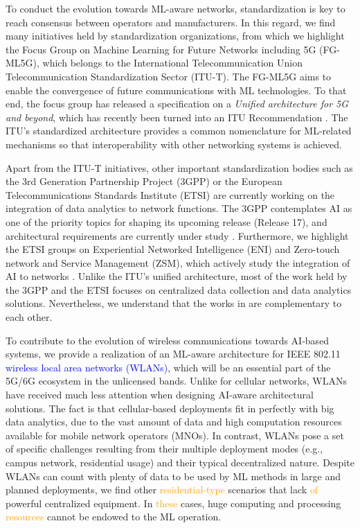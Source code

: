 \documentclass[journal]{IEEEtran}
\begin{document}
To conduct the evolution towards ML-aware networks, standardization is key to reach consensus between operators and manufacturers. In this regard, we find many initiatives held by standardization organizations, from which we highlight the Focus Group on Machine Learning for Future Networks including 5G (FG-ML5G), which belongs to the International Telecommunication Union Telecommunication Standardization Sector (ITU-T). The FG-ML5G aims to enable the convergence of future communications with ML technologies. To that end, the focus group has released a specification on a \emph{Unified architecture for 5G and beyond}, which has recently been turned into an ITU Recommendation \cite{itu2019architecture}. The ITU's standardized architecture provides a common nomenclature for ML-related mechanisms so that interoperability with other networking systems is achieved. 

Apart from the ITU-T initiatives, other important standardization bodies such as the 3rd Generation Partnership Project (3GPP) or the European Telecommunications Standards Institute (ETSI) are currently working on the integration of data analytics to network functions. The 3GPP contemplates AI as one of the priority topics for shaping its upcoming release (Release 17), and architectural requirements are currently under study \cite{3gpp2019study}. Furthermore, we highlight the ETSI groups on Experiential Networked Intelligence (ENI) and Zero-touch network and Service Management (ZSM), which actively study the integration of AI to networks \cite{etsi2019architecture}. Unlike the ITU's unified architecture, most of the work held by the 3GPP and the ETSI focuses on centralized data collection and data analytics solutions. Nevertheless, we understand that the works in \cite{itu2019architecture, 3gpp2019study, etsi2019architecture} are complementary to each other.

To contribute to the evolution of wireless communications towards AI-based systems, we provide a realization of an ML-aware architecture for IEEE 802.11 \textcolor{blue}{wireless local area networks (WLANs)}, which will be an essential part of the 5G/6G ecosystem in the unlicensed bands. Unlike for cellular networks, WLANs have received much less attention when designing AI-aware architectural solutions. The fact is that cellular-based deployments fit in perfectly with big data analytics, due to the vast amount of data and high computation resources available for mobile network operators (MNOs). In contrast, WLANs pose a set of specific challenges resulting from their multiple deployment modes (e.g., campus network, residential usage) and their typical decentralized nature. Despite WLANs can count with plenty of data to be used by ML methods in large and planned deployments, we find other  \textcolor{orange}{residential-type} scenarios that lack \textcolor{orange}{of} powerful centralized equipment. In  \textcolor{orange}{these} cases, huge computing and processing  \textcolor{orange}{resources} cannot be endowed to the ML operation.
\end{document}
